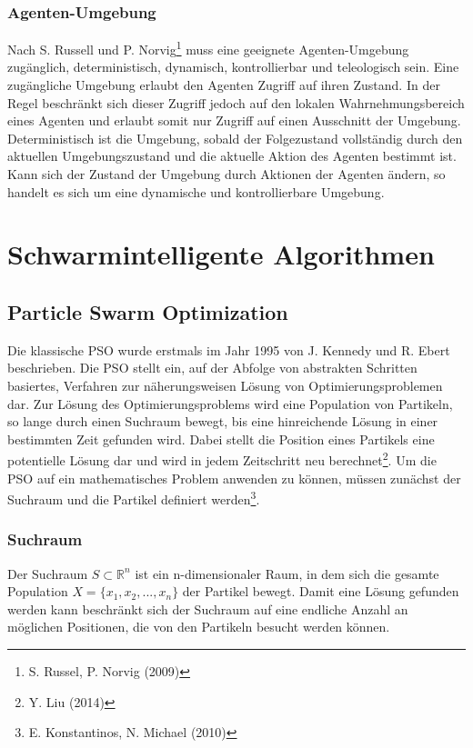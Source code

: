 \documentclass[a4paper, 11pt]{article}
\begin{document}
\subsubsection{Agenten-Umgebung}
Nach S. Russell und P. Norvig\footnote{S. Russel, P. Norvig (2009)} muss eine geeignete Agenten-Umgebung zugänglich, deterministisch, dynamisch, kontrollierbar und teleologisch sein. Eine zugängliche Umgebung erlaubt den Agenten Zugriff auf ihren Zustand. In der Regel beschränkt sich dieser Zugriff jedoch auf den lokalen Wahrnehmungsbereich eines Agenten und erlaubt somit nur Zugriff auf einen Ausschnitt der Umgebung. Deterministisch ist die Umgebung, sobald der Folgezustand vollständig durch den aktuellen Umgebungszustand und die aktuelle Aktion des Agenten bestimmt ist. Kann sich der Zustand der Umgebung durch Aktionen der Agenten ändern, so handelt es sich um eine dynamische und kontrollierbare Umgebung.
\newpage
\section{Schwarmintelligente Algorithmen}
\subsection{Particle Swarm Optimization}
Die klassische \ac{PSO} wurde erstmals im Jahr 1995 von J. Kennedy und R. Ebert beschrieben. Die \acs{PSO} stellt ein, auf der Abfolge von abstrakten Schritten basiertes, Verfahren zur näherungsweisen Lösung von Optimierungsproblemen dar. Zur Lösung des Optimierungsproblems wird eine Population von Partikeln, so lange durch einen Suchraum bewegt, bis eine hinreichende Lösung in einer bestimmten Zeit gefunden wird. Dabei stellt die Position eines Partikels eine potentielle Lösung dar und wird in jedem Zeitschritt neu berechnet\footnote{Y. Liu (2014)}. Um die \acs{PSO} auf ein mathematisches Problem anwenden zu können, müssen zunächst der Suchraum und die Partikel definiert werden\footnote{E. Konstantinos, N. Michael (2010)}.
\subsubsection{Suchraum}
Der Suchraum $S \subset \mathbb{R}^n$ ist ein n-dimensionaler Raum, in dem sich die gesamte Population $X=\{x_{1},x_{2},...,x_{n}\}$ der Partikel bewegt. Damit eine Lösung gefunden werden kann beschränkt sich der Suchraum auf eine endliche Anzahl an möglichen Positionen, die von den Partikeln besucht werden können.
\end{document}
